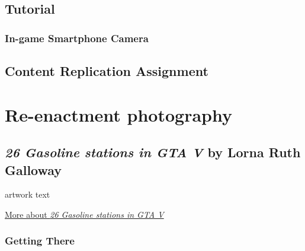 \documentclass[
  openany]{book}
\begin{document}
\hypertarget{tutorial-1}{%
\section*{Tutorial}\label{tutorial-1}}

\hypertarget{in-game-smartphone-camera}{%
\subsection*{In-game Smartphone Camera}\label{in-game-smartphone-camera}}

\hypertarget{content-replication-assignment-1}{%
\section*{Content Replication Assignment}\label{content-replication-assignment-1}}

\hypertarget{re-enactment-photography}{%
\chapter{Re-enactment photography}\label{re-enactment-photography}}

\hypertarget{gasoline-stations-in-gta-v-by-lorna-ruth-galloway}{%
\section*{\texorpdfstring{\emph{26 Gasoline stations in GTA V} by Lorna Ruth Galloway}{26 Gasoline stations in GTA V by Lorna Ruth Galloway}}\label{gasoline-stations-in-gta-v-by-lorna-ruth-galloway}}

artwork text

\href{https://www.lornaruthgalloway.com/charcoal-halftone}{More about \emph{26 Gasoline stations in GTA V}}

\hypertarget{getting-there-3}{%
\subsection*{Getting There}\label{getting-there-3}}
\end{document}

